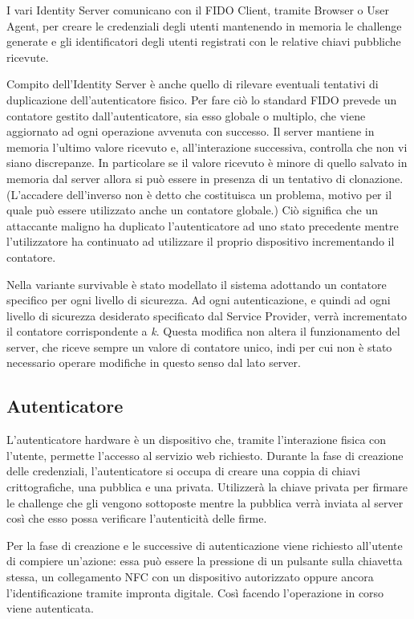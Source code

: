 I vari Identity Server comunicano con il FIDO Client, tramite Browser o User Agent, per creare le credenziali degli utenti mantenendo in memoria le challenge generate e gli identificatori degli utenti registrati con le relative chiavi pubbliche ricevute. 

Compito dell'Identity Server è anche quello di rilevare eventuali tentativi di duplicazione dell'autenticatore fisico. Per fare ciò lo standard FIDO prevede un contatore gestito dall'autenticatore, sia esso globale o multiplo, che viene aggiornato ad ogni operazione avvenuta con successo. Il server mantiene in memoria l'ultimo valore ricevuto e, all'interazione successiva, controlla che non vi siano discrepanze. In particolare se il valore ricevuto è minore di quello salvato in memoria dal server allora si può essere in presenza di un tentativo di clonazione. (L'accadere dell'inverso non è detto che costituisca un problema, motivo per il quale può essere utilizzato anche un contatore globale.) Ciò significa che un attaccante maligno ha duplicato l'autenticatore ad uno stato precedente mentre l'utilizzatore ha continuato ad utilizzare il proprio dispositivo incrementando il contatore. 

Nella variante survivable è stato modellato il sistema adottando un contatore specifico per ogni livello di sicurezza. Ad ogni autenticazione, e quindi ad ogni livello di sicurezza desiderato specificato dal Service Provider, verrà incrementato il contatore corrispondente a \emph{k}. Questa modifica non altera il funzionamento del server, che riceve sempre un valore di contatore unico, indi per cui non è stato necessario operare modifiche in questo senso dal lato server.

\subsection{Autenticatore}
\label{autenticatore}

L'autenticatore hardware è un dispositivo che, tramite l'interazione fisica con l'utente, permette l'accesso al servizio web richiesto. Durante la fase di creazione delle credenziali, l'autenticatore si occupa di creare una coppia di chiavi crittografiche, una pubblica e una privata. Utilizzerà la chiave privata per firmare le challenge che gli vengono sottoposte mentre la pubblica verrà inviata al server così che esso possa verificare l'autenticità delle firme.

Per la fase di creazione e le successive di autenticazione viene richiesto all'utente di compiere un'azione: essa può essere la pressione di un pulsante sulla chiavetta stessa, un collegamento NFC con un dispositivo autorizzato oppure ancora l'identificazione tramite impronta digitale. Così facendo l'operazione in corso viene autenticata.

